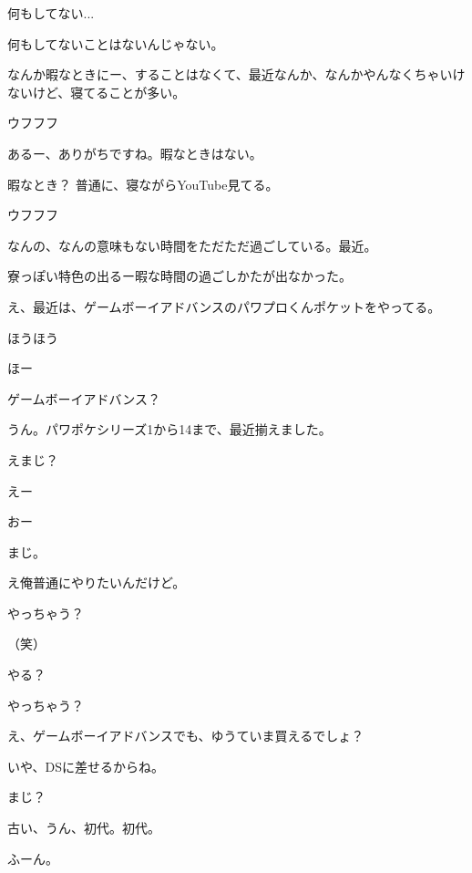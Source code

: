 \begin{multicols}{3}
{        何もしてない...

        何もしてないことはないんじゃない。

        なんか暇なときにー、することはなくて、最近なんか、なんかやんなくちゃいけないけど、寝てることが多い。

        ウフフフ

        あるー、ありがちですね。暇なときはない。

        暇なとき？ 普通に、寝ながらYouTube見てる。

        ウフフフ

        なんの、なんの意味もない時間をただただ過ごしている。最近。

        寮っぽい特色の出るー暇な時間の過ごしかたが出なかった。

        え、最近は、ゲームボーイアドバンスのパワプロくんポケットをやってる。

        ほうほう

        ほー

        ゲームボーイアドバンス？

        うん。パワポケシリーズ1から14まで、最近揃えました。

        えまじ？

        えー

        おー

        まじ。

        え俺普通にやりたいんだけど。

        やっちゃう？

        （笑）

        やる？

        やっちゃう？

        え、ゲームボーイアドバンスでも、ゆうていま買えるでしょ？

        いや、DSに差せるからね。

        まじ？

        古い、うん、初代。初代。

        ふーん。

}
\end{multicols}
